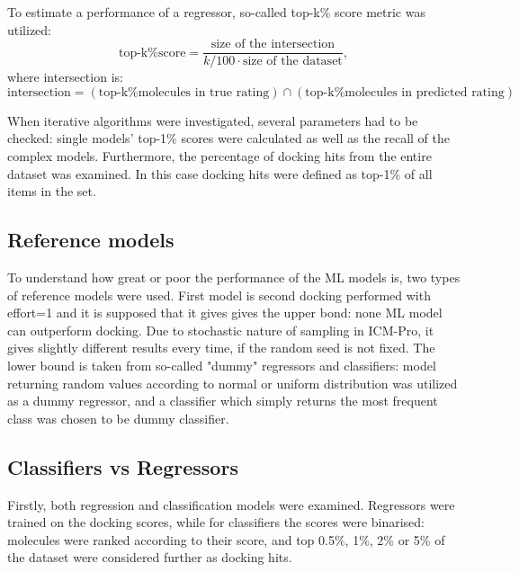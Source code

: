 To estimate a performance of a regressor, so-called top-k\% score metric was utilized:
\begin{equation*}
\text{top-k\% score} = \frac{\text{size of the intersection}}{k/100 \cdot \text{size of the dataset}},
\end{equation*}
where intersection is:
\begin{equation*}
         \text{intersection} = \left( \text{top-k\% molecules in true rating}\right) \cap \left( \text{top-k\% molecules in predicted rating}\right)
\end{equation*}

When iterative algorithms were investigated, several parameters had to be checked: single models' top-1\% scores were calculated as well as the recall of the complex models.
Furthermore, the percentage of docking hits from the entire dataset was examined.
In this case docking hits were defined as top-1\% of all items in the set.\\

\subsection{Reference models}
To understand how great or poor the performance of the ML models is, two types of reference models were used.
First model is second docking performed with effort=1 and it is supposed that it gives gives the upper bond: none ML model can outperform docking. 
Due to stochastic nature of sampling in ICM-Pro, it gives slightly different results every time, if the random seed is not fixed.
The lower bound is taken from so-called "dummy" regressors and classifiers: model returning random values according to normal or uniform distribution was utilized as a dummy regressor, and a classifier which simply returns the most frequent class was chosen to be dummy classifier.\\

\subsection{Classifiers vs Regressors}

Firstly, both regression and classification models were examined.
Regressors were trained on the docking scores, while for classifiers the scores were binarised: molecules were ranked according to their score, and top 0.5\%, 1\%, 2\% or 5\% of the dataset were considered further as docking hits.\\

